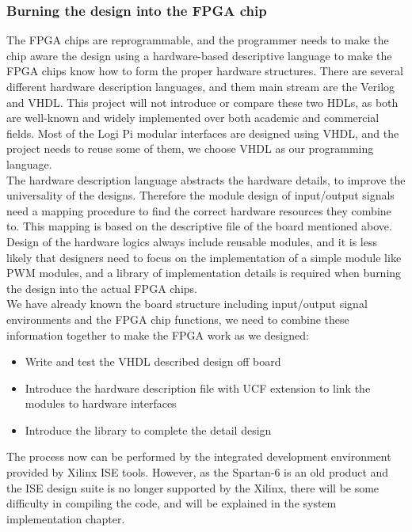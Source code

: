 \documentclass[11pt,openright,a4paper]{report}
\begin{document}
\subsubsection{Burning the design into the FPGA chip}
The FPGA chips are reprogrammable, and the programmer needs to make the chip aware the design using a hardware-based descriptive language to make the FPGA chips know how to form the proper hardware structures. There are several different hardware description languages, and them main stream are the Verilog and VHDL. This project will not introduce or compare these two HDLs, as both are well-known and widely implemented over both academic and commercial fields. Most of the Logi Pi modular interfaces are designed using VHDL, and the project needs to reuse some of them, we choose VHDL as our programming language.\\
The hardware description language abstracts the hardware details, to improve the universality of the designs. Therefore the module design of input/output signals need a mapping procedure to find the correct hardware resources they combine to. This mapping is based on the descriptive file of the board mentioned above.\\
Design of the hardware logics always include reusable modules, and it is less likely that designers need to focus on the implementation of a simple module like PWM modules, and a library of implementation details is required when burning the design into the actual FPGA chips.\\
We have already known the board structure including input/output signal environments and the FPGA chip functions, we need to combine these information together to make the FPGA work as we designed:
\begin{itemize}
	\item Write and test the VHDL described design off board
	\item Introduce the hardware description file with UCF extension to link the modules to hardware interfaces
	\item Introduce the library to complete the detail design
\end{itemize}
The process now can be performed by the integrated development environment provided by Xilinx ISE tools. However, as the Spartan-6 is an old product and the ISE design suite is no longer supported by the Xilinx, there will be some difficulty in compiling the code, and will be explained in the system implementation chapter.\\
\end{document}
